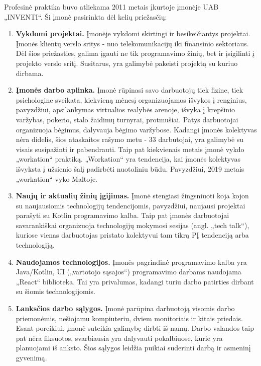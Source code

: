 Profesinė praktika buvo atliekama 2011 metais įkurtoje įmonėje UAB „INVENTI“. Ši įmonė pasirinkta dėl kelių priežasčių:

\begin{enumerate}
    \item \textbf{Vykdomi projektai.} Įmonėje vykdomi skirtingi ir besikeičiantys projektai. Įmonės klientų verslo sritys - nuo telekomunikacijų iki finansinio sektoriaus.
    Dėl šios priežasties, galima įgauti ne tik programavimo žinių, bet ir įsigilinti į projekto verslo sritį. Susitarus, yra galimybė pakeisti projektą su kuriuo dirbama.
    \item \textbf{Įmonės darbo aplinka.} Įmonė rūpinasi savo darbuotojų tiek fizine, tiek psichologine sveikata, kiekvieną mėnesį organizuojamos išvykos į renginius, pavyzdžiui,
    apsilankymas virtualios realybės arenoje, išvyka į krepšinio varžybas, pokerio, stalo žaidimų turnyrai, protmušiai. Patys darbuotojai organizuoja bėgimus, dalyvauja bėgimo
    varžybose. Kadangi įmonės kolektyvas nėra didelis, šios ataskaitos rašymo metu - 33 darbutojai, yra galimybė su visais susipažinti ir pabendrauti.
    Taip pat kiekvienais metais įmonė vykdo „workation“ praktiką. „Workation“ yra tendencija, kai įmonės kolektyvas išvyksta į užsienio šalį padirbėti nuotoliniu būdu.
    Pavyzdžiui, 2019 metais „workation“ vyko Maltoje.
    \item \textbf{Naujų ir aktualių žinių įgijimas.} Įmonė stengiasi žingsniuoti koja kojon su naujausiomis technologijų tendencijomis, pavyzdžiui, naujausi projektai parašyti su
    Kotlin programavimo kalba. Taip pat įmonės darbuotojai savarankiškai organizuoja technologijų mokymosi sesijas (angl. „tech talk“), kuriose vienas darbuotojas pristato kolektyvui
    tam tikrą PĮ tendenciją arba technologiją.
    \item \textbf{Naudojamos technologijos.} Įmonės pagrindinė programavimo kalba yra Java/Kotlin, UI („vartotojo sąsajos“) programavimo darbams naudojama „React“ biblioteka. Tai yra privalumas,
    kadangi turiu darbo patirties dirbant su šiomis technologijomis.
    \item \textbf{Lanksčios darbo sąlygos.} Įmonė parūpina darbuotoją visomis darbo priemonėmis, nešiojamu kompiuteriu, dviem monitoriais ir kitais priedais. Esant poreikiui,
    įmonė suteikia galimybę dirbti iš namų. Darbo valandos taip pat nėra fiksuotos, svarbiausia yra dalyvauti pokalbiuose, kurie yra planuojami iš anksto. Šios sąlygos leidžia
    puikiai suderinti darbą ir asmeninį gyvenimą.
\end{enumerate}

